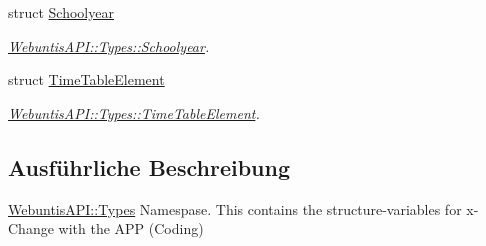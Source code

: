 \begin{DoxyCompactItemize}
struct \hyperlink{struct_webuntis_a_p_i_1_1_types_1_1_schoolyear}{Schoolyear}
\begin{DoxyCompactList}\small\item\em \hyperlink{struct_webuntis_a_p_i_1_1_types_1_1_schoolyear}{Webuntis\-A\-P\-I\-::\-Types\-::\-Schoolyear}. \end{DoxyCompactList}\item 
struct \hyperlink{struct_webuntis_a_p_i_1_1_types_1_1_time_table_element}{Time\-Table\-Element}
\begin{DoxyCompactList}\small\item\em \hyperlink{struct_webuntis_a_p_i_1_1_types_1_1_time_table_element}{Webuntis\-A\-P\-I\-::\-Types\-::\-Time\-Table\-Element}. \end{DoxyCompactList}\end{DoxyCompactItemize}


\subsection{Ausführliche Beschreibung}
\hyperlink{namespace_webuntis_a_p_i_1_1_types}{Webuntis\-A\-P\-I\-::\-Types} Namespase. This contains the structure-\/variables for x-\/\-Change with the A\-P\-P (Coding) 